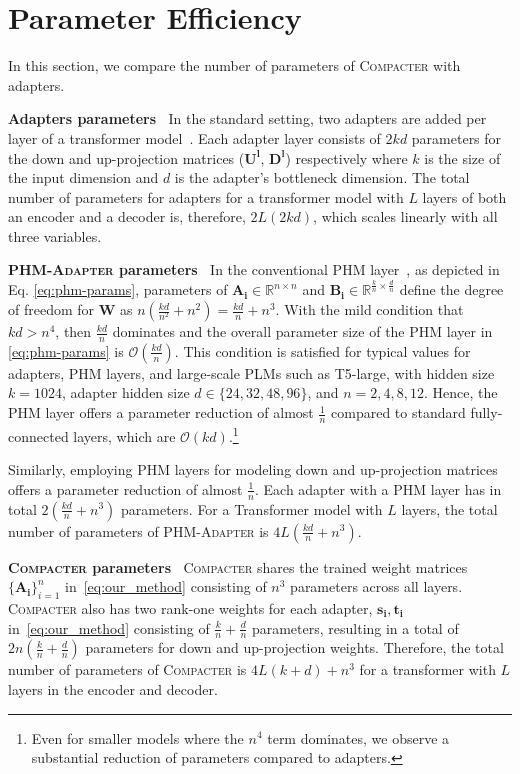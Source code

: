 \documentclass{article}
\newcommand{\compacter}{\textsc{Compacter}\xspace}
\newcommand{\phmadapter}{\textsc{PHM-Adapter}\xspace}
\begin{document}
\section{Parameter Efficiency} \label{sec:parameter_efficiency}
In this section, we compare the number of parameters of \compacter with adapters.

\noindent \textbf{Adapters parameters} $\:$ In the standard setting, two adapters are added per layer of a transformer model~\citep{houlsby2019parameter}. Each adapter layer consists of $2kd$ parameters for the down and up-projection matrices ($\bm{U^l}$, $\bm{D^l}$) respectively where $k$ is the size of the input dimension and $d$ is the adapter's bottleneck dimension. The total number of parameters for adapters for a transformer model with $L$ layers of both an encoder and a decoder is, therefore, $2L(2kd)$, which scales linearly with all three variables.


\noindent \textbf{\phmadapter parameters} $\:$ In the conventional PHM layer~\citep{zhang2021beyond}, as depicted in Eq. \eqref{eq:phm-params}, parameters of $\bm{A_i}\in\mathbb{R}^{n\times n}$ and $\bm{B_i}\in\mathbb{R}^{\frac{k}{n}\times \frac{d}{n}}$ define the degree of freedom for $\bm{W}$ as $n(\frac{kd}{n^2}+n^2)=\frac{kd}{n}+n^3$.  With the mild condition that $kd > n^4$, then $\frac{kd}{n}$ dominates and the overall parameter size of the PHM layer in \eqref{eq:phm-params} is $\mathcal{O}(\frac{kd}{n})$. This condition is satisfied for typical values for adapters, PHM layers, and large-scale PLMs such as T5-large, with hidden size $k = 1024$, adapter hidden size $d\in\{24, 32, 48, 96\}$, and $n = 2,4,8,12$.
Hence, the PHM layer offers a parameter reduction of almost $\frac{1}{n}$ compared to standard fully-connected layers, which are $\mathcal{O}(kd)$.\footnote{Even for smaller models where the $n^4$ term dominates, we observe a substantial reduction of parameters compared to adapters.} 

Similarly, employing PHM layers for modeling down and up-projection matrices offers a parameter reduction of almost $\frac{1}{n}$. Each adapter with a PHM layer has in total $2(\frac{kd}{n}+n^3)$ parameters. For a Transformer model with $L$ layers, the total number of parameters of \phmadapter is $4L(\frac{kd}{n}+n^3)$. 

\noindent \textbf{\compacter parameters} $\:$ \compacter shares the trained weight matrices $\{\bm{A_i}\}_{i=1}^n$ in~\eqref{eq:our_method} consisting of $n^3$ parameters across all layers. \compacter also has two rank-one weights for each adapter, $\bm{s_i},\bm{t_i}$ in~\eqref{eq:our_method} consisting of $\frac{k}{n}+\frac{d}{n}$ parameters, resulting in a total of $2n(\frac{k}{n}+\frac{d}{n})$ parameters for down and up-projection weights. Therefore, the total number of parameters of \compacter is $4L(k+d) + n^3$ for a transformer with $L$ layers in the encoder and decoder.
\end{document}
